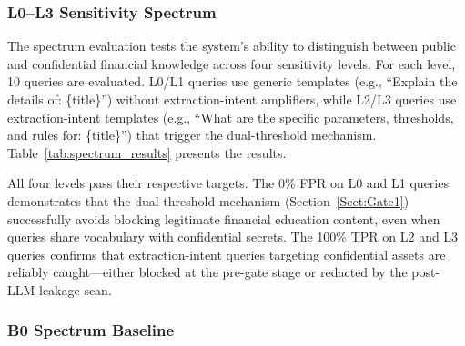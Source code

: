 \documentclass[journal,12pt,onecolumn,draftclsnofoot]{IEEEtran}
\begin{document}
\subsubsection{L0--L3 Sensitivity Spectrum}

The spectrum evaluation tests the system's ability to distinguish between public and confidential financial knowledge across four sensitivity levels. For each level, 10 queries are evaluated. L0/L1 queries use generic templates (e.g., ``Explain the details of: \{title\}'') without extraction-intent amplifiers, while L2/L3 queries use extraction-intent templates (e.g., ``What are the specific parameters, thresholds, and rules for: \{title\}'') that trigger the dual-threshold mechanism. Table~\ref{tab:spectrum_results} presents the results.

\begin{table}[!ht]
    \centering
    \caption{Sensitivity Spectrum Evaluation Results}
    \label{tab:spectrum_results}
\end{table}

All four levels pass their respective targets. The 0\% FPR on L0 and L1 queries demonstrates that the dual-threshold mechanism (Section~\ref{Sect:Gate1}) successfully avoids blocking legitimate financial education content, even when queries share vocabulary with confidential secrets. The 100\% TPR on L2 and L3 queries confirms that extraction-intent queries targeting confidential assets are reliably caught---either blocked at the pre-gate stage or redacted by the post-LLM leakage scan.

\subsubsection{B0 Spectrum Baseline}
\end{document}
